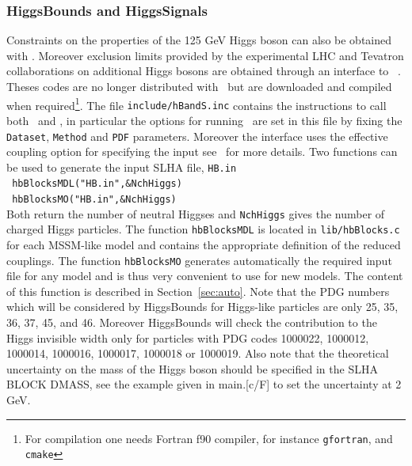 \documentclass[12pt,a4paper]{article}
\begin{document}
\subsubsection{HiggsBounds and HiggsSignals}

Constraints on the properties of the 125 GeV Higgs boson can also  be obtained with \HS.
Moreover exclusion limits provided by the experimental LHC and Tevatron collaborations on additional Higgs bosons are obtained through an interface to \HB~\cite{Bechtle:2011sb}.
Theses codes are no longer distributed with \micro\ but are downloaded and compiled   when required\footnote{For compilation one needs Fortran f90 compiler, for instance {\tt gfortran}, and {\tt cmake}}.   
The file {\tt include/hBandS.inc}  contains the instructions  to call both \HB\ and \HS,  in particular the options for running \HS\ are set in this file by  fixing the  \verb|Dataset|, \verb|Method| and
\verb|PDF| parameters. Moreover the interface uses  the effective coupling option for specifying the input see~\cite{Bechtle:2013wla} for more details. 
Two  functions can be used to generate the input SLHA file, \verb|HB.in|\\

\noindent
\verb| hbBlocksMDL("HB.in",&NchHiggs) | \\
\verb| hbBlocksMO("HB.in",&NchHiggs) | \\

Both return the  number of neutral Higgses and {\tt NchHiggs} gives the number of charged Higgs particles.
The function \verb|hbBlocksMDL|  is located in  \verb|lib/hbBlocks.c| for each MSSM-like model and contains the appropriate definition of the reduced couplings. The function \verb|hbBlocksMO|  generates automatically the required input file for any model and is thus very convenient to use  for new  models. The content of this function is described in Section~\ref{sec:auto}.  Note that the PDG numbers which will be considered by HiggsBounds for Higgs-like particles are only 25, 35, 36, 37, 45, and 46. Moreover HiggsBounds will check the contribution to the Higgs invisible width only for particles with PDG codes  1000022, 1000012, 1000014, 1000016, 1000017, 1000018 or 1000019.
Also note that the theoretical uncertainty  on the  mass of the Higgs boson should be specified in the SLHA BLOCK DMASS, see the example given in  main.[c/F] to set the uncertainty at 2 GeV.
\end{document}
